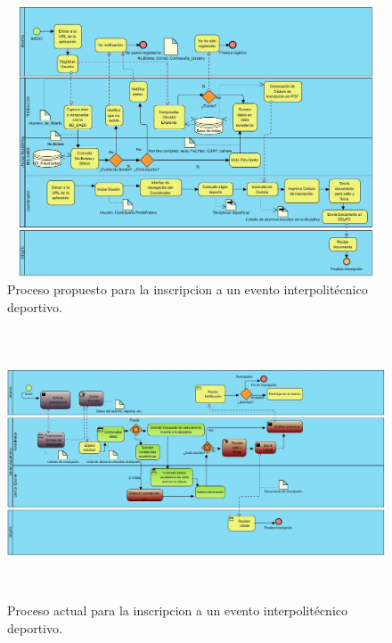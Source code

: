 		\begin{figure}[hbt!]
			\centering
			\includegraphics[width=16cm, height=8cm]{Imagenes/Disenos/Inscripcion1.jpg}
			\caption{Proceso propuesto para la inscripcion a un evento interpolitécnico deportivo.}
			\label{Inscripcion1}
		\end{figure}
	
		\begin{figure}[hbt!]
			\centering
			\includegraphics[width=16cm, height=8cm]{Imagenes/Disenos/ProcesoInscripcionActual.jpg}
			\caption{Proceso actual para la inscripcion a un evento interpolitécnico deportivo.}
			\label{Inscripcion}
		\end{figure}
	
